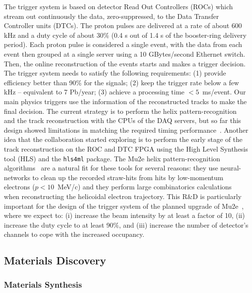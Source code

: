The trigger system is based on detector Read Out Controllers (ROCs) which stream out continuously the data, zero-suppressed, to the Data Transfer Controller units (DTCs). The proton pulses are delivered at a rate of about 600 kHz and a duty cycle of about 30\% (0.4 s out of 1.4 s of the booster-ring delivery period). Each proton pulse is considered a single event, with the data from each event then grouped at a single server using a 10 GBytes/second Ethernet switch. Then, the online reconstruction of the events starts and makes a trigger decision.  The trigger system needs to satisfy the following requirements: (1)  provide efficiency better than 90\% for the signals; (2)  keep the trigger rate below a few kHz -- equivalent to 7 Pb/year; (3) achieve a processing time $<5$~ms/event. Our main physics triggers use the information of the reconstructed tracks to make the final decision.  The current strategy is to perform the helix pattern-recognition and the track reconstruction with the CPUs of the DAQ servers, but so far this design showed limitations in matching the required timing performance~\cite{pezzullo_gianantonio_2020_4088480}. Another idea that the collaboration started exploring is to perform the early stage of the track reconstruction on the ROC and DTC FPGA using the High Level Synthesis tool (HLS) and the \texttt{hls4ml} package. The Mu2e helix pattern-recognition algorithms~\cite{pezzullo_gianantonio_2020_4088480} are a natural fit for these tools for several reasons: they use neural-networks to clean up the recorded straw-hits from hits by low-momentum electrons ($p<10$~MeV/c) and they perform large combinatorics calculations when reconstructing the helicoidal electron trajectory. This R\&D is particularly important for the design of the trigger system of the planned upgrade of Mu2e~\cite{abusalma2018expression}, where we expect to: (i) increase the beam intensity by at least a factor of 10, (ii) increase the duty cycle to at least 90\%, and (iii) increase the number of detector's channels to cope with the increased occupancy.


\subsection{Materials Discovery}
\subsubsection{Materials Synthesis}

